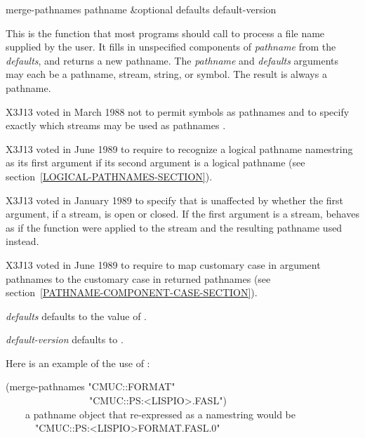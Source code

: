 \begin{defun}[Function]
merge-pathnames pathname &optional defaults default-version


\begin{obsolete}
This is the function that most programs should call to process a file
name supplied by the user.  It fills in unspecified components of
{\it pathname} from the {\it defaults}, and returns a new pathname.  The
{\it pathname} and {\it defaults} arguments may each
be a pathname, stream, string, or symbol.  The
result is always a pathname.
\end{obsolete}

\begin{new}
X3J13 voted in March 1988
not to permit symbols as pathnames
 and
to specify exactly which streams may be used as pathnames
.
\end{new}

\begin{newer}
X3J13 voted in June 1989  to require 
to recognize a logical pathname namestring as its first argument
if its second argument is a logical pathname (see section~\ref{LOGICAL-PATHNAMES-SECTION}).
\end{newer}

\begin{new}
X3J13 voted in January 1989
to specify that  is unaffected by
whether the first argument, if a stream, is open or closed. If the first
argument is a stream,  behaves as if the function
 were applied to the stream and the resulting pathname used instead.
\end{new}

\begin{newer}
X3J13 voted in June 1989  to
require  to map customary case in argument
pathnames to the customary case in returned pathnames
(see section~\ref{PATHNAME-COMPONENT-CASE-SECTION}).
\end{newer}

{\it defaults} defaults to the value of .

{\it default-version} defaults to .

Here is an example of the use of :
\begin{lisp}
(merge-pathnames "CMUC::FORMAT" \\
~~~~~~~~~~~~~~~~~"CMUC::PS:<LISPIO>.FASL") \\
~~~\EV\ {\rm a pathname object that re-expressed as a namestring would be} \\
~~~~~~"CMUC::PS:<LISPIO>FORMAT.FASL.0"
\end{lisp}


\end{defun}
